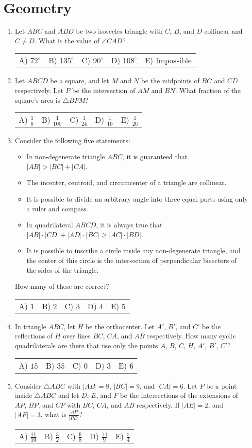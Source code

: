 \documentclass{article}
\newcommand{\answers}[5]{
    \newline
    {
        \centering
        \begin{tabular}{p{0.15\textwidth} p{0.15\textwidth} p{0.15\textwidth} p{0.15\textwidth} p{0.15\textwidth}}
            A) #1 & B) #2 & C) #3 & D) #4 & E) #5
        \end{tabular}
    }
}
\begin{document}
\section{Geometry}
\begin{enumerate}[1.]

\item %
Let $ABC$ and $ABD$ be two isosceles triangle with $C$, $B$, and $D$ collinear and $C \ne D$.
What is the value of $\angle CAD$?
\answers{$72^\circ$}{$135^\circ$}{$90^\circ$}{$108^\circ$}{Impossible}

\item %
Let $ABCD$ be a square, and let $M$ and $N$ be the midpoints of $BC$ and $CD$ respectively.
Let $P$ be the intersection of $AM$ and $BN$.
What fraction of the square's area is $\triangle BPM$?
\answers{ $\frac{1}{8}$ }{ $\frac{1}{100}$ }{ $\frac{1}{24}$ }{ $\frac{1}{10}$ }{ $\frac{1}{20}$ }


\item %
Consider the following five statements:
\begin{itemize}
    \item In non-degenerate triangle $ABC$, it is guaranteed that $|AB| > |BC| + |CA|$.
    \item The incenter, centroid, and circumcenter of a triangle are collinear.
    \item It is possible to divide an arbitrary angle into three equal parts using only a ruler and compass.
    \item In quadrilateral $ABCD$, it is always true that $|AB| \cdot |CD| + |AD| \cdot |BC| \ge |AC| \cdot |BD|$.
    \item It is possible to inscribe a circle inside any non-degenerate triangle, and the center of this circle is the intersection of perpendicular bisectors of the sides of the triangle.
\end{itemize}
How many of these are correct?
\answers{$1$}{$2$}{$3$}{$4$}{$5$}

\item %
In triangle $ABC$, let $H$ be the orthocenter.
Let $A'$, $B'$, and $C'$ be the reflections of $H$ over lines $BC$, $CA$, and $AB$ respectively.
How many cyclic quadrilaterals are there that use only the points $A$, $B$, $C$, $H$, $A'$, $B'$, $C'$?
\answers{$15$}{$35$}{$0$}{$3$}{$6$}


\item %
Consider $\triangle ABC$ with $|AB| = 8$, $|BC| = 9$, and $|CA| = 6$.
Let $P$ be a point inside $\triangle ABC$ and let $D$, $E$, and $F$ be the intersections of the extensions of $AP$, $BP$, and $CP$ with $BC$, $CA$, and $AB$ respectively.
If $|AE| = 2$, and $|AF| = 3$, what is $\frac{|AP|}{|PD|}$?
\answers{ $\frac{11}{10}$ }{ $\frac{3}{2}$ }{ $\frac{9}{8}$ }{ $\frac{14}{9}$ }{ $\frac{5}{4}$ }

\end{enumerate}
\end{document}
